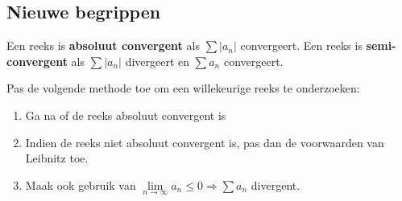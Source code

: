 \subsection{Nieuwe begrippen}
Een reeks is \textbf{absoluut convergent} als $\sum |a_n|$ convergeert. Een reeks is \textbf{semi-convergent} als $\sum |a_n|$ divergeert en $\sum a_n$ convergeert.

Pas de volgende methode toe om een willekeurige reeks te onderzoeken:
\begin{enumerate}
	\item Ga na of de reeks absoluut convergent is
	\item Indien de reeks niet absoluut convergent is, pas dan de voorwaarden van Leibnitz toe.
	\item Maak ook gebruik van $\lim\limits_{n\to\infty} a_n \leq 0 \Rightarrow \sum a_n$ divergent.
\end{enumerate}

